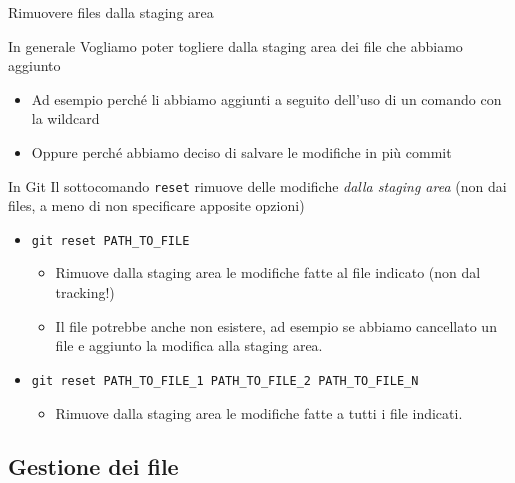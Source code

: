 \documentclass[xcolor=dvipsnames,presentation]{beamer}
\begin{document}
\begin{frame}{Rimuovere files dalla staging area}
	\begin{block}{In generale}
		Vogliamo poter togliere dalla staging area dei file che abbiamo aggiunto
		\begin{itemize}
			\item Ad esempio perché li abbiamo aggiunti a seguito dell'uso di un comando con la
wildcard
			\item Oppure perché abbiamo deciso di salvare le modifiche in più commit
		\end{itemize}
	\end{block}
	\begin{block}{In Git}
		Il sottocomando \texttt{reset} rimuove delle modifiche \textit{dalla staging area} (non dai
files, a meno di non specificare apposite opzioni)
		\begin{itemize}
			\item \texttt{git reset PATH\_TO\_FILE}
			\begin{itemize}
				\item Rimuove dalla staging area le modifiche fatte al file indicato (non dal
tracking!)
				\item Il file potrebbe anche non esistere, ad esempio se abbiamo cancellato un file
e aggiunto la modifica alla staging area.
			\end{itemize}
			\item \texttt{git reset PATH\_TO\_FILE\_1 PATH\_TO\_FILE\_2 PATH\_TO\_FILE\_N}
			\begin{itemize}
				\item Rimuove dalla staging area le modifiche fatte a tutti i file indicati.
			\end{itemize}
		\end{itemize}
	\end{block}
\end{frame}

\subsection{Gestione dei file}
\end{document}
